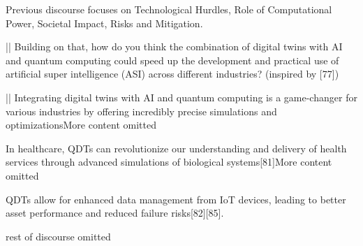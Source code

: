 \begin{showcase}[title=Topic: The Emergence of Artificial Super Intelligence: Future Prospects and Impacts]

{Previous discourse focuses on Technological Hurdles, Role of Computational Power, Societal Impact, Risks and Mitigation.}

||
Building on that, how do you think the combination of digital twins with AI and quantum computing could speed up the development and practical use of artificial super intelligence (ASI) across different industries? (inspired by [77])

||
Integrating digital twins with AI and quantum computing is a game-changer for various industries by offering incredibly precise simulations and optimizations{More content omitted}

In healthcare, QDTs can revolutionize our understanding and delivery of health services through advanced simulations of biological systems[81]{More content omitted}

QDTs allow for enhanced data management from IoT devices, leading to better asset performance and reduced failure risks[82][85].

{rest of discourse omitted}

\end{showcase}